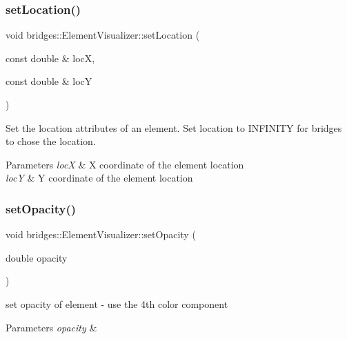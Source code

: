\subsubsection{\texorpdfstring{setLocation()}{setLocation()}}
{\footnotesize\ttfamily void bridges\+::\+Element\+Visualizer\+::set\+Location (\begin{DoxyParamCaption}\item[{const double \&}]{locX,  }\item[{const double \&}]{locY }\end{DoxyParamCaption})\hspace{0.3cm}{\ttfamily [inline]}}

Set the location attributes of an element. Set location to I\+N\+F\+I\+N\+I\+TY for bridges to chose the location.


\begin{DoxyParams}{Parameters}
{\em locX} & X coordinate of the element location \\
\hline
{\em locY} & Y coordinate of the element location \\
\hline
\end{DoxyParams}
\mbox{\label{classbridges_1_1_element_visualizer_a8f77db4a2774021aec4ab8ea18e50fc9}} 
\subsubsection{\texorpdfstring{setOpacity()}{setOpacity()}}
{\footnotesize\ttfamily void bridges\+::\+Element\+Visualizer\+::set\+Opacity (\begin{DoxyParamCaption}\item[{double}]{opacity }\end{DoxyParamCaption})\hspace{0.3cm}{\ttfamily [inline]}}

set opacity of element -\/ use the 4th color component


\begin{DoxyParams}{Parameters}
{\em opacity} & \\
\hline
\end{DoxyParams}
\mbox{\label{classbridges_1_1_element_visualizer_af81cc20423f2fedffa81fb7c473a1179}} 
